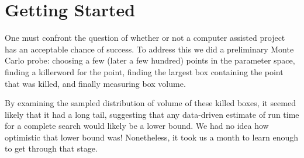 \section{Getting Started}
One must confront the question of whether or not a computer
assisted project has an acceptable chance of success.
To address this we did a preliminary Monte Carlo probe:
choosing a few (later a few hundred) points in the parameter space,
finding a killerword for the point,
finding the largest box containing the point that was killed,
and finally measuring box volume.

By examining the sampled distribution of volume of these killed boxes,
it seemed likely that it had a long tail,
suggesting that any data-driven estimate of run time for a complete search
would likely be a lower bound.
We had no idea how optimistic that lower bound was!
Nonetheless, it took us a month to learn enough to get through that stage.

